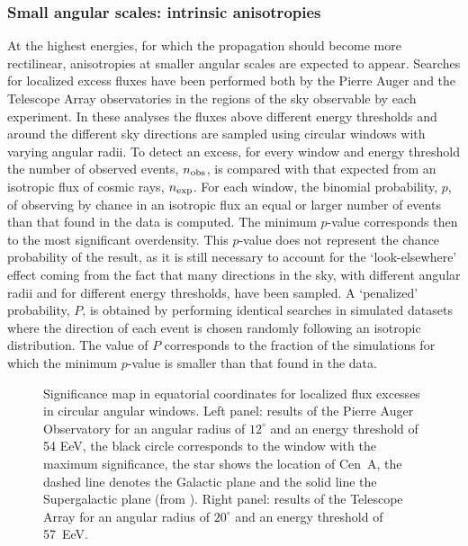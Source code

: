 \documentclass[twoside,12pt]{article}
\begin{document}
\subsubsection{Small angular scales: intrinsic anisotropies}

At the highest energies, for which the propagation should become more rectilinear, anisotropies at smaller angular scales are expected to appear. Searches for localized excess fluxes have been performed both by the Pierre Auger and the Telescope Array observatories in the regions of the sky observable by each experiment. In these analyses the fluxes above different energy thresholds and around the  different sky directions are sampled using circular windows with varying angular radii. To detect an excess, for every window and energy threshold the number of observed events, $n_{\rm obs}$, is compared with that expected from an isotropic flux of cosmic rays, $n_{\rm exp}$. For each window, the binomial probability, $p$, of observing by chance in an isotropic flux an equal or larger number of events than that found in the data is computed. The minimum $p$-value corresponds then to  the most significant overdensity. This $p$-value does not represent the chance probability of the result, as it is still necessary to account for the `look-elsewhere' effect coming from the fact that many directions in the sky, with different angular radii and for different energy thresholds, have been sampled. A `penalized' probability, $P$, is obtained by performing identical searches  in simulated datasets where the direction of each event is chosen randomly following an isotropic distribution. The value of $P$ corresponds to the fraction of the simulations for which the minimum $p$-value is smaller than that found in the data.

\begin{figure}
\begin{center}
\begin{minipage}[t]{8 cm}
\centerline{%
}
\end{minipage}
\begin{minipage}[t]{16.5 cm}
\caption{Significance map in equatorial coordinates for localized flux excesses in circular angular windows. Left panel: results of the Pierre Auger Observatory for an angular radius of $12^\circ$ and an energy threshold of 54 EeV, the black circle corresponds to the window with the maximum significance, the star shows the location of Cen~A, the dashed line denotes the Galactic plane and the solid line the Supergalactic plane (from \cite{SS15}). Right panel: results of the Telescope Array for an angular radius of $20^\circ$ and an energy threshold of 57~EeV. \label{od}}
\end{minipage}
\end{center}
\end{figure}
 
\end{document}
